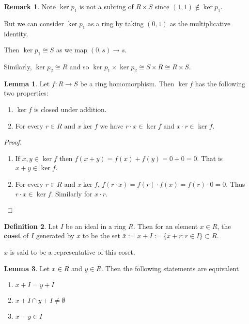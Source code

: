 \documentclass[12pt,a4paper]{article}
\theoremstyle{definition}
\newtheorem{definition}{Definition}[subsection]
\newtheorem{lemma}[definition]{Lemma}
\newtheorem*{remark}{Remark}
\begin{document}
\begin{remark}
	Note $\ker p_1$ is not a subring of $R \times S$ since $(1, 1) \notin \ker p_1$.

	But we can consider $\ker p_1$ as a ring by taking $(0, 1)$ as the multiplicative identity.

	Then $\ker p_1 \cong S$ as we map $(0, s) \rightarrow s$.

	Similarly, $\ker p_2 \cong R$ and so $\ker p_1 \times \ker p_2 \cong S \times R \cong R \times S$.
\end{remark}

\begin{lemma}
	Let $f: R \rightarrow S$ be a ring homomorphism. Then $\ker f$ has the following two properties:
	\begin{enumerate}
		\item $\ker f$ is closed under addition.
		\item For every $r \in R$ and $x \ker f$ we have $r \cdot x \in \ker f$ and $x \cdot r \in \ker f$.
	\end{enumerate}
\end{lemma}

\begin{proof}
	\hfill
	\begin{enumerate}
		\item If $x, y \in \ker f$ then $f(x + y) = f(x) + f(y) = 0 + 0 = 0$. That is $x + y \in \ker f$.
		\item For every $r \in R$ and $x \ker f$, $f(r \cdot x) = f(r) \cdot f(x) = f(r) \cdot 0 = 0$. Thus $r \cdot x \in \ker f$. Similarly for $x \cdot r$.
	\end{enumerate}
\end{proof}

\begin{definition}
	Let $I$ be an ideal in a ring $R$. Then for an element $x \in R$, the \textbf{coset} of $I$ generated by $x$ to be the set $\bar{x} := x + I := \{ x + r: r \in I \} \subset R$.

	$x$ is said to be a representative of this coset.
\end{definition}

\begin{lemma}
	Let $x \in R$ and $y \in R$. Then the following statements are equivalent
	\begin{enumerate}
		\item $x + I = y + I$
		\item $x + I \cap y + I \ne \emptyset$
		\item $x - y \in I$
	\end{enumerate}
\end{lemma}
\end{document}
